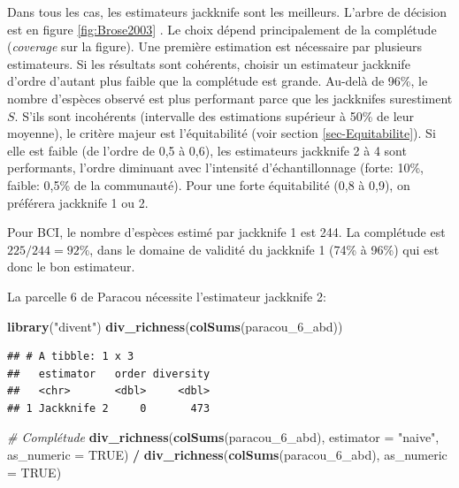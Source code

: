 \documentclass[
  11pt,
  american,
  a4paper,
  extrafontsizes,onecolumn,openright
  ]{memoir}
\newenvironment{Shaded}{\begin{snugshade}}{\end{snugshade}}
\newcommand{\AttributeTok}[1]{\textcolor[rgb]{0.13,0.29,0.53}{#1}}
\newcommand{\CommentTok}[1]{\textcolor[rgb]{0.56,0.35,0.01}{\textit{#1}}}
\newcommand{\ConstantTok}[1]{\textcolor[rgb]{0.56,0.35,0.01}{#1}}
\newcommand{\FunctionTok}[1]{\textcolor[rgb]{0.13,0.29,0.53}{\textbf{#1}}}
\newcommand{\NormalTok}[1]{#1}
\newcommand{\SpecialCharTok}[1]{\textcolor[rgb]{0.81,0.36,0.00}{\textbf{#1}}}
\newcommand{\StringTok}[1]{\textcolor[rgb]{0.31,0.60,0.02}{#1}}
\newlength{\rf}
\begin{document}
\normalsize

Dans tous les cas, les estimateurs jackknife sont les meilleurs.
L'arbre de décision est en figure \ref{fig:Brose2003} \autocite[fig.~6]{Brose2003}.
Le choix dépend principalement de la complétude (\emph{coverage} sur la figure).
Une première estimation est nécessaire par plusieurs estimateurs.
Si les résultats sont cohérents, choisir un estimateur jackknife d'ordre d'autant plus faible que la complétude est grande.
Au-delà de 96\%, le nombre d'espèces observé est plus performant parce que les jackknifes surestiment \(S\).
S'ils sont incohérents (intervalle des estimations supérieur à 50\% de leur moyenne), le critère majeur est l'équitabilité (voir section \ref{sec-Equitabilite}).
Si elle est faible (de l'ordre de 0,5 à 0,6), les estimateurs jackknife 2 à 4 sont performants, l'ordre diminuant avec l'intensité d'échantillonnage (forte: 10\%, faible: 0,5\% de la communauté).
Pour une forte équitabilité (0,8 à 0,9), on préférera jackknife 1 ou 2.

Pour BCI, le nombre d'espèces estimé par jackknife 1 est 244.
La complétude est \({225}/{244} = 92\%\), dans le domaine de validité du jackknife 1 (74\% à 96\%) qui est donc le bon estimateur.

La parcelle 6 de Paracou nécessite l'estimateur jackknife 2:

\scriptsize

\begin{Shaded}
\begin{Highlighting}[]
\FunctionTok{library}\NormalTok{(}\StringTok{"divent"}\NormalTok{)}
\FunctionTok{div\_richness}\NormalTok{(}\FunctionTok{colSums}\NormalTok{(paracou\_6\_abd))}
\end{Highlighting}
\end{Shaded}

\begin{verbatim}
## # A tibble: 1 x 3
##   estimator   order diversity
##   <chr>       <dbl>     <dbl>
## 1 Jackknife 2     0       473
\end{verbatim}

\begin{Shaded}
\begin{Highlighting}[]
\CommentTok{\# Complétude}
\FunctionTok{div\_richness}\NormalTok{(}\FunctionTok{colSums}\NormalTok{(paracou\_6\_abd), }\AttributeTok{estimator =} \StringTok{"naive"}\NormalTok{, }\AttributeTok{as\_numeric =} \ConstantTok{TRUE}\NormalTok{) }\SpecialCharTok{/} 
  \FunctionTok{div\_richness}\NormalTok{(}\FunctionTok{colSums}\NormalTok{(paracou\_6\_abd), }\AttributeTok{as\_numeric =} \ConstantTok{TRUE}\NormalTok{)}
\end{Highlighting}
\end{Shaded}
\end{document}
